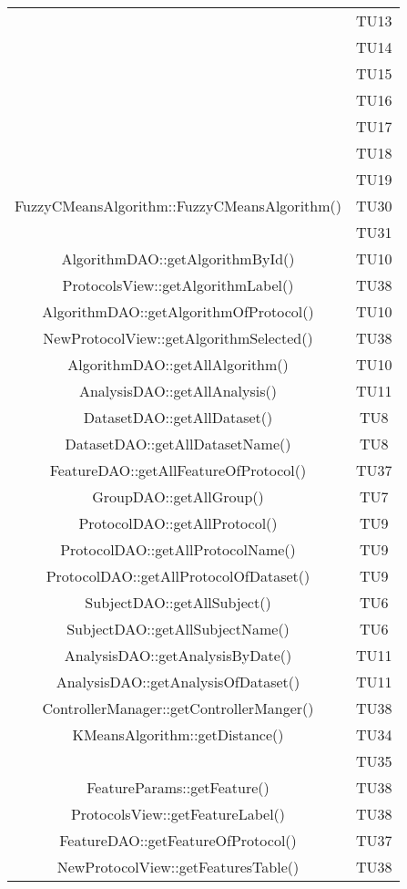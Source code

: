 \begin{center}
\begin{longtable}{|c|c|}
 & TU13 \\
 & TU14 \\
 & TU15 \\
 & TU16 \\
 & TU17 \\
 & TU18 \\
 & TU19 \\
\hline 
FuzzyCMeansAlgorithm::FuzzyCMeansAlgorithm() & TU30 \\
 & TU31 \\
\hline 
AlgorithmDAO::getAlgorithmById() & TU10 \\
\hline 
ProtocolsView::getAlgorithmLabel() & TU38 \\
\hline 
AlgorithmDAO::getAlgorithmOfProtocol() & TU10 \\
\hline 
NewProtocolView::getAlgorithmSelected() & TU38 \\
\hline 
AlgorithmDAO::getAllAlgorithm() & TU10 \\
\hline 
AnalysisDAO::getAllAnalysis() & TU11 \\
\hline 
DatasetDAO::getAllDataset() & TU8 \\
\hline 
DatasetDAO::getAllDatasetName() & TU8 \\
\hline 
FeatureDAO::getAllFeatureOfProtocol() & TU37 \\
\hline 
GroupDAO::getAllGroup() & TU7 \\
\hline 
ProtocolDAO::getAllProtocol() & TU9 \\
\hline 
ProtocolDAO::getAllProtocolName() & TU9 \\
\hline 
ProtocolDAO::getAllProtocolOfDataset() & TU9 \\
\hline 
SubjectDAO::getAllSubject() & TU6 \\
\hline 
SubjectDAO::getAllSubjectName() & TU6 \\
\hline 
AnalysisDAO::getAnalysisByDate() & TU11 \\
\hline 
AnalysisDAO::getAnalysisOfDataset() & TU11 \\
\hline 
ControllerManager::getControllerManger() & TU38 \\
\hline 
KMeansAlgorithm::getDistance() & TU34 \\
 & TU35 \\
\hline 
FeatureParams::getFeature() & TU38 \\
\hline 
ProtocolsView::getFeatureLabel() & TU38 \\
\hline 
FeatureDAO::getFeatureOfProtocol() & TU37 \\
\hline 
NewProtocolView::getFeaturesTable() & TU38 \\

\end{longtable}
\end{center}
